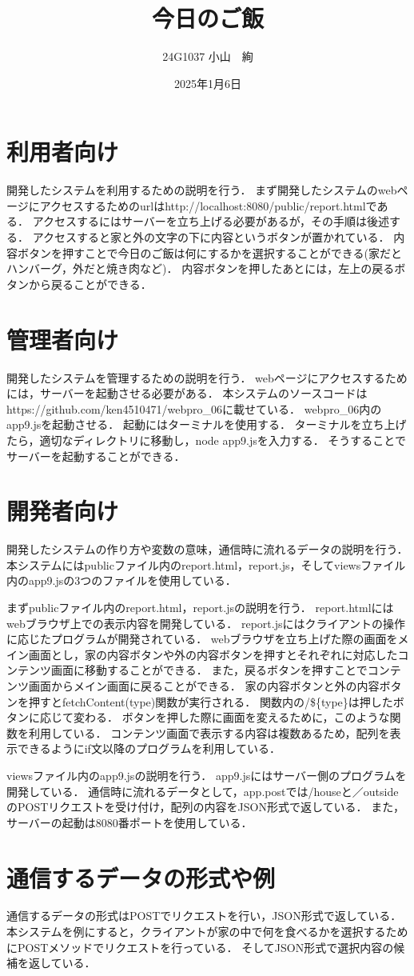 \documentclass[uplatex,dvipdfmx]{jsarticle}
\begin{document}
\title{今日のご飯} %
\author{24G1037 小山　絢}
\date{2025年1月6日}
\maketitle
\section{利用者向け}
開発したシステムを利用するための説明を行う．
まず開発したシステムのwebページにアクセスするためのurlはhttp://localhost:8080/public/report.htmlである．
アクセスするにはサーバーを立ち上げる必要があるが，その手順は後述する．
アクセスすると家と外の文字の下に内容というボタンが置かれている．
内容ボタンを押すことで今日のご飯は何にするかを選択することができる(家だとハンバーグ，外だと焼き肉など)．
内容ボタンを押したあとには，左上の戻るボタンから戻ることができる．
\section{管理者向け}
開発したシステムを管理するための説明を行う．
webページにアクセスするためには，サーバーを起動させる必要がある．
本システムのソースコードはhttps://github.com/ken4510471/webpro\_06に載せている．
webpro\_06内のapp9.jsを起動させる．
起動にはターミナルを使用する．
ターミナルを立ち上げたら，適切なディレクトリに移動し，node app9.jsを入力する．
そうすることでサーバーを起動することができる．
\section{開発者向け}
開発したシステムの作り方や変数の意味，通信時に流れるデータの説明を行う．
本システムにはpublicファイル内のreport.html，report.js，そしてviewsファイル内のapp9.jsの3つのファイルを使用している．

まずpublicファイル内のreport.html，report.jsの説明を行う．
report.htmlにはwebブラウザ上での表示内容を開発している．
report.jsにはクライアントの操作に応じたプログラムが開発されている．
webブラウザを立ち上げた際の画面をメイン画面とし，家の内容ボタンや外の内容ボタンを押すとそれぞれに対応したコンテンツ画面に移動することができる．
また，戻るボタンを押すことでコンテンツ画面からメイン画面に戻ることができる．
家の内容ボタンと外の内容ボタンを押すとfetchContent(type)関数が実行される．
関数内の/\$\{type\}は押したボタンに応じて変わる．
ボタンを押した際に画面を変えるために，このような関数を利用している．
コンテンツ画面で表示する内容は複数あるため，配列を表示できるようにif文以降のプログラムを利用している．

viewsファイル内のapp9.jsの説明を行う．
app9.jsにはサーバー側のプログラムを開発している．
通信時に流れるデータとして，app.postでは/houseと／outsideのPOSTリクエストを受け付け，配列の内容をJSON形式で返している．
また，サーバーの起動は8080番ポートを使用している．

\section{通信するデータの形式や例}
通信するデータの形式はPOSTでリクエストを行い，JSON形式で返している．
本システムを例にすると，クライアントが家の中で何を食べるかを選択するためにPOSTメソッドでリクエストを行っている．
そしてJSON形式で選択内容の候補を返している．
\end{document}
